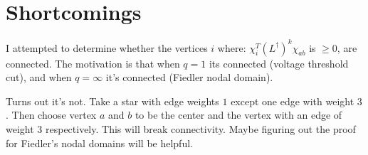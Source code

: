 \section{Shortcomings}
I attempted to determine whether the vertices $i$ where:
$\chi_{i}^T \left(L^{\dag}\right)^k\chi_{ab}$ is $ \geq 0$, are connected. The
motivation is that when $q=1$ its connected (voltage threshold
cut), and when $q = \infty$ it's connected (Fiedler nodal
domain).

Turns out it's not. Take a star with edge weights $1$ except one
edge with weight $3$. Then choose vertex $a$ and $b$ to be the center
and the vertex with an edge of weight $3$ respectively. This will break
connectivity.
Maybe figuring out the proof for Fiedler's nodal domains will be
helpful.
